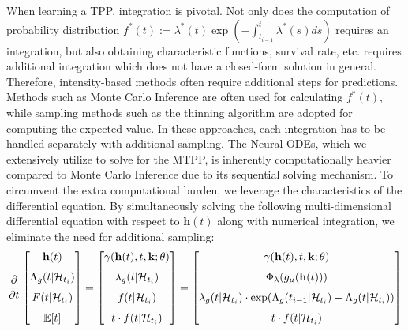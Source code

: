 When learning a TPP, integration is pivotal. Not only does the computation of probability distribution $f ^*(t):= \lambda^*(t) \exp(-\int _{t_{i-1}} ^t \lambda^* (s) ds)$ requires an integration, but also obtaining characteristic functions, survival rate, etc. requires additional integration 
which does not have a closed-form solution in general. 
Therefore, intensity-based methods often require additional steps for predictions. 
Methods such as Monte Carlo Inference \cite{bib:nhp, bib:sahp, bib:THP, bib:ANHP} are often used for calculating $f^*(t)$, 
while sampling methods such as the thinning algorithm \cite{bib:nhp} are adopted for computing the expected value. 
In these approaches, each integration has to be handled separately with additional sampling.
The Neural ODEs, which we extensively utilize to solve for the MTPP, 
is inherently computationally heavier compared to Monte Carlo Inference due to its sequential solving mechanism. 
To circumvent the extra computational burden, we leverage the characteristics of the differential equation. 
By simultaneously solving the following multi-dimensional differential equation with respect to $\mathbf{h}(t)$ along with numerical integration, we eliminate the need for additional sampling: 
\begin{align}
\label{eqn:multi-integral}
{\partial \over \partial t} 
\begin{bmatrix}
\mathbf{h}(t) \\[1.5ex] 
\Lambda_g (t |  \mathcal{H}_{t_i}) \\[1.5ex] 
F(t | \mathcal{H}_{t_i}) \\[1.5ex] 
\mathbb{E}[t]
\end{bmatrix}
= 
\begin{bmatrix}
\gamma (\mathbf{h}(t),t, \mathbf{k}; \theta) \\[1.5ex] 
\lambda_g(t | \mathcal{H}_{t_i}) \\[1.5ex] 
f(t|\mathcal{H}_{t_i}) \\[1.5ex] 
t \cdot f(t|\mathcal{H}_{t_i})
\end{bmatrix}
= 
\begin{bmatrix}
\gamma (\mathbf{h}(t),t,\mathbf{k}; \theta) \\[1.5ex] 
\Phi_\lambda( g_\mu(\mathbf{h}(t))) \\[1.5ex] 
\lambda_g(t|\mathcal{H}_{t_i}) \cdot \exp (\Lambda_g(t_{i-1}|\mathcal{H}_{t_i}) - \Lambda_g(t|\mathcal{H}_{t_i}) ) \\[1.5ex] 
t \cdot f(t|\mathcal{H}_{t_i}) 
\end{bmatrix}
\end{align}

